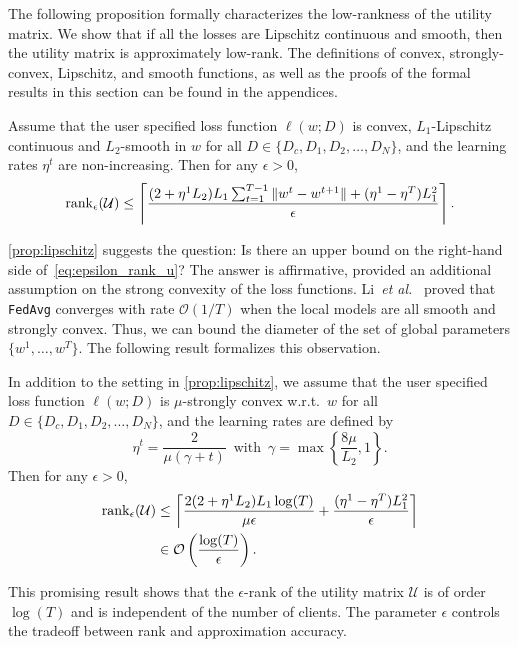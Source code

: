 The following proposition formally characterizes the low-rankness of the utility matrix. We show that if all the losses are Lipschitz continuous and smooth, then the utility matrix is approximately low-rank. The definitions of convex, strongly-convex, Lipschitz, and smooth functions, as well as the proofs of the formal results in this section can be found in the appendices.

\begin{proposition} \label{prop:lipschitz}
    Assume that the user specified loss function $\ell(w; D)$ is convex, $L_1$-Lipschitz continuous and $L_2$-smooth in $w$ for all $D \in \{D_c, D_1, D_2, \dots, D_N\}$, and the learning rates $\eta^t$ are non-increasing. 
    Then for any $\epsilon>0$, 
    \begin{equation} \label{eq:epsilon_rank_u}
        \operatorname{rank}_{\epsilon}(\mathcal{U}) \leq \left\lceil \frac{(2+\eta^1L_2) L_1 \sum_{t=1}^{T-1} \|w^{t} - w^{t+1}\| + (\eta^1 - \eta^T) L_1^2}{\epsilon} \right\rceil.
    \end{equation} 
\end{proposition}

\autoref{prop:lipschitz} suggests the question: Is there an upper bound on the right-hand side of~\eqref{eq:epsilon_rank_u}? The answer is affirmative, provided an additional assumption on the strong convexity of the loss functions. Li~\textit{et al.}~\cite{li2019convergence} proved that \texttt{FedAvg} converges with rate $\mathcal{O}(1 / T)$ when the local models are all smooth and strongly convex. Thus, we can bound the diameter of the set of global parameters $\{w^1, \dots, w^T\}$. The following result formalizes this observation. 

\begin{proposition} \label{prop:strongly_cvx}
    In addition to the setting in \autoref{prop:lipschitz}, we assume that the user specified loss function $\ell(w; D)$ is $\mu$-strongly convex w.r.t.\ $w$ for all $D \in \{D_c, D_1, D_2, \dots, D_N\}$, and the learning rates are defined by 
    \[\eta^t = \frac{2}{\mu(\gamma + t)} \enspace\text{with}\enspace \gamma = \max\left\{\frac{8\mu}{L_2}, 1\right\}.\]
    Then for any $\epsilon>0$, 
    \begin{align*}
        \operatorname{rank}_{\epsilon}(\mathcal{U}) &\leq \left\lceil \frac{2(2+\eta^1L_2) L_1 \log(T)}{\mu\epsilon} +  \frac{(\eta^1 - \eta^T)L_1^2}{\epsilon} \right\rceil
        \\&\in \mathcal{O}\left(\frac{\log(T)}{\epsilon}\right).
    \end{align*}
\end{proposition}
This promising result shows that the $\epsilon$-rank of the utility matrix $\mathcal{U}$ is of order $\log(T)$ and is independent of the number of clients. The parameter $\epsilon$ controls the tradeoff between rank and approximation accuracy.

